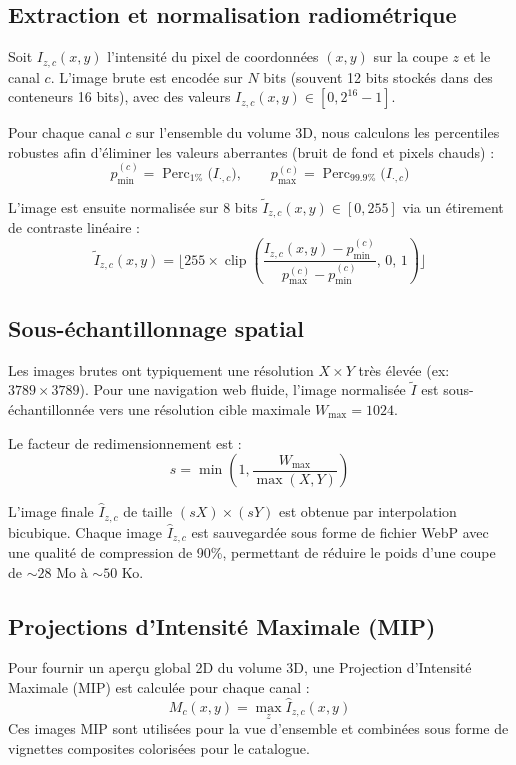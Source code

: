 \documentclass[11pt,a4paper]{article}
\begin{document}
\subsection{Extraction et normalisation radiométrique}

Soit $I_{z,c}(x,y)$ l'intensité du pixel de coordonnées $(x,y)$ sur la coupe $z$ et le canal $c$. L'image brute est encodée sur $N$ bits (souvent 12 bits stockés dans des conteneurs 16 bits), avec des valeurs $I_{z,c}(x,y) \in [0, 2^{16}-1]$.

Pour chaque canal $c$ sur l'ensemble du volume 3D, nous calculons les percentiles robustes afin d'éliminer les valeurs aberrantes (bruit de fond et pixels chauds) :
\[
p_{\min}^{(c)} = \operatorname{Perc}_{1\%}\big(I_{\cdot,c}\big), \qquad p_{\max}^{(c)} = \operatorname{Perc}_{99.9\%}\big(I_{\cdot,c}\big)
\]

L'image est ensuite normalisée sur 8 bits $\tilde{I}_{z,c}(x,y) \in [0, 255]$ via un étirement de contraste linéaire :
\[
\tilde{I}_{z,c}(x,y) = \lfloor 255 \times \operatorname{clip}\left( \frac{I_{z,c}(x,y) - p_{\min}^{(c)}}{p_{\max}^{(c)} - p_{\min}^{(c)}}, \, 0, \, 1 \right) \rfloor
\]

\subsection{Sous-échantillonnage spatial}

Les images brutes ont typiquement une résolution $X \times Y$ très élevée (ex: $3789 \times 3789$). Pour une navigation web fluide, l'image normalisée $\tilde{I}$ est sous-échantillonnée vers une résolution cible maximale $W_{\max} = 1024$. 

Le facteur de redimensionnement est :
\[
s = \min\left(1, \frac{W_{\max}}{\max(X, Y)}\right)
\]

L'image finale $\hat{I}_{z,c}$ de taille $(sX) \times (sY)$ est obtenue par interpolation bicubique. Chaque image $\hat{I}_{z,c}$ est sauvegardée sous forme de fichier WebP avec une qualité de compression de 90\%, permettant de réduire le poids d'une coupe de $\sim 28$ Mo à $\sim 50$ Ko.

\subsection{Projections d'Intensité Maximale (MIP)}

Pour fournir un aperçu global 2D du volume 3D, une Projection d'Intensité Maximale (MIP) est calculée pour chaque canal :
\[
M_c(x,y) = \max_{z} \hat{I}_{z,c}(x,y)
\]
Ces images MIP sont utilisées pour la vue d'ensemble et combinées sous forme de vignettes composites colorisées pour le catalogue.
\end{document}

